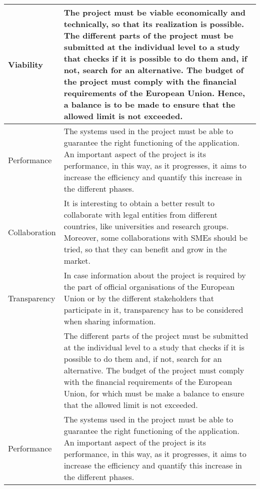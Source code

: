 \begin{longtable}[H]{l p{10.2cm}}
	Viability & The project must be viable economically and technically, so that its realization is possible. \newline
	The different parts of the project must be submitted at the individual level to a study that checks if it is possible to do them and, if not, search for an alternative. \newline
	The budget of the project must comply with the financial requirements of the European Union. Hence, a balance is to be made to ensure that the allowed limit is not exceeded. \vspace{0.2cm}
	\\ \midrule
	
	Performance & The systems used in the project must be able to guarantee the right functioning of the application. An important aspect of the project is its performance, in this way, as it progresses, it aims to increase the efficiency and quantify this increase in the different phases. \vspace{0.2cm}
	\\ \midrule
	
	Collaboration & It is interesting to obtain a better result to collaborate with legal entities from different countries, like universities and research groups. Moreover, some collaborations with SMEs should be tried, so that they can benefit and grow in the market. \vspace{0.2cm}	
	\\ \midrule
	
	Transparency & In case information about the project is required by the part of official organisations of the European Union or by the different stakeholders that participate in it, transparency has to be considered when sharing information. \vspace{0.2cm}
	\\ \midrule

	& The different parts of the project must be submitted at the individual level to a study that checks if it is possible to do them and, if not, search for an alternative. 
	\newline
	The budget of the project must comply with the financial requirements of the European Union, for which must be make a balance to ensure that the allowed limit is not exceeded. \vspace{0.2cm}
	\\ \midrule

	Performance & The systems used in the project must be able to guarantee the right functioning of the application. An important aspect of the project is its performance, in this way, as it progresses, it aims to increase the efficiency and quantify this increase in the different phases. \vspace{0.2cm}
	\\ \midrule


\end{longtable}
